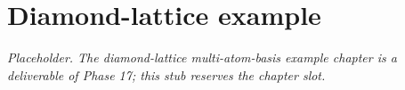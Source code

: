 \chapter{Diamond-lattice example}
\label{chap:diamond-lattice}

\textit{Placeholder. The diamond-lattice multi-atom-basis example
chapter is a deliverable of Phase 17; this stub reserves the chapter
slot.}
